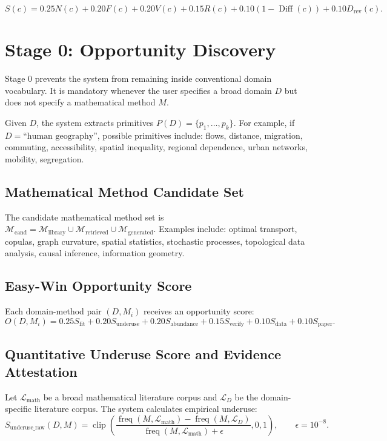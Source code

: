\documentclass[11pt]{article}
\newcommand{\clip}{\operatorname{clip}}
\newcommand{\freq}{\operatorname{freq}}
\begin{document}
$$
S(c) = 0.25N(c) + 0.20F(c) + 0.20V(c) + 0.15R(c) + 0.10(1-\operatorname{Diff}(c)) + 0.10D_{\text{rev}}(c).
$$

\section{Stage 0: Opportunity Discovery}

Stage 0 prevents the system from remaining inside conventional domain vocabulary. It is mandatory whenever the user specifies a broad domain $D$ but does not specify a mathematical method $M$.

Given $D$, the system extracts primitives $P(D)=\{p_1,\dots,p_k\}$. For example, if $D=\text{``human geography''}$, possible primitives include: flows, distance, migration, commuting, accessibility, spatial inequality, regional dependence, urban networks, mobility, segregation.

\subsection{Mathematical Method Candidate Set}

The candidate mathematical method set is $\mathcal{M}_{\text{cand}} = \mathcal{M}_{\text{library}} \cup \mathcal{M}_{\text{retrieved}} \cup \mathcal{M}_{\text{generated}}.$ Examples include: optimal transport, copulas, graph curvature, spatial statistics, stochastic processes, topological data analysis, causal inference, information geometry.

\subsection{Easy-Win Opportunity Score}

Each domain-method pair $(D,M_i)$ receives an opportunity score:
$$
O(D,M_i) = 0.25S_{\text{fit}} + 0.20S_{\text{underuse}} + 0.20S_{\text{abundance}} + 0.15S_{\text{verify}} + 0.10S_{\text{data}} + 0.10S_{\text{paper}}.
$$

\subsection{Quantitative Underuse Score and Evidence Attestation}

Let $\mathcal{L}_{\text{math}}$ be a broad mathematical literature corpus and $\mathcal{L}_{D}$ be the domain-specific literature corpus. The system calculates empirical underuse:
$$
S_{\text{underuse\_raw}}(D,M) = \clip\left( \frac{\freq(M,\mathcal{L}_{\text{math}}) - \freq(M,\mathcal{L}_{D})}{\freq(M,\mathcal{L}_{\text{math}})+\epsilon}, 0, 1 \right), \qquad \epsilon=10^{-8}.
$$
\end{document}
